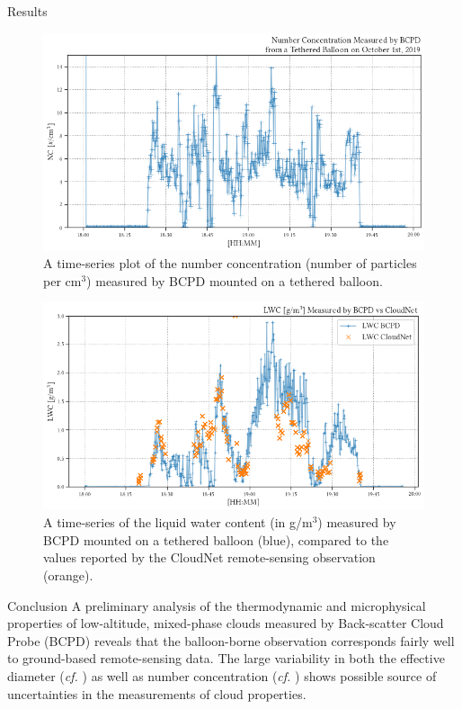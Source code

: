 \documentclass[final]{beamer}
\newlength{\colwidth}
\begin{document}
\begin{frame}[t]
\begin{columns}[t]
\begin{column}{\colwidth}
\begin{block}{Results}
        \begin{figure}
          \centering
          \includegraphics[width=\colwidth]{figure/ts_nc.png}
          \caption{A time-series plot of the number concentration (number of particles per cm$^3$) measured by BCPD mounted on a tethered balloon.}
          \label{fig:04}
        \end{figure}

        \begin{figure}
          \centering
          \includegraphics[width=\colwidth]{figure/ts_lwc.png}
          \caption{A time-series of the liquid water content (in g/m$^3$) measured by BCPD mounted on a tethered balloon (blue), compared to the values reported by the CloudNet remote-sensing observation (orange).}
          \label{fig:05}
        \end{figure}

      \end{block}

      \begin{block}{Conclusion}
        A preliminary analysis of the thermodynamic and microphysical properties of low-altitude, mixed-phase clouds measured by Back-scatter Cloud Probe (BCPD) \cite{baumgardner2014ice,thomson2014compact} reveals that the balloon-borne observation corresponds fairly well to ground-based remote-sensing data. The large variability in both the effective diameter (\emph{cf.} ) as well as number concentration (\emph{cf.} ) shows possible source of uncertainties in the measurements of cloud properties. 
        

\end{block}
\end{column}
\end{columns}
\end{frame}
\end{document}
